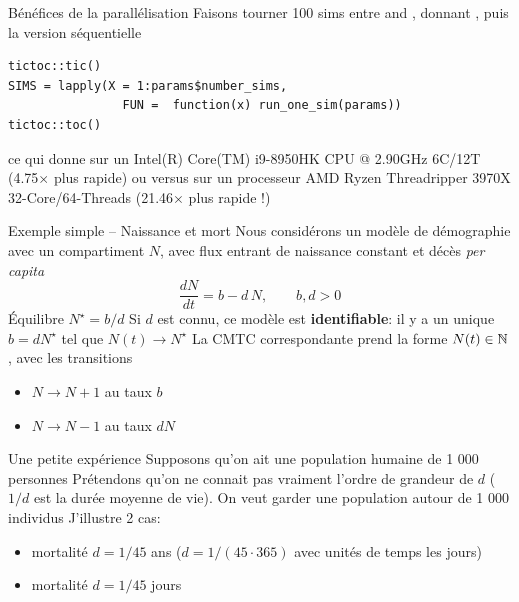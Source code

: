 \documentclass[aspectratio=169]{beamer}\usepackage[]{graphicx}\usepackage[]{xcolor}
\begin{document}

\begin{frame}[fragile]{Bénéfices de la parallélisation}
    Faisons tourner 100 sims entre  and , donnant , puis la version séquentielle
\begin{lstlisting}
tictoc::tic()
SIMS = lapply(X = 1:params$number_sims,
                FUN =  function(x) run_one_sim(params))
tictoc::toc()
\end{lstlisting}
    ce qui donne  sur un Intel(R) Core(TM) i9-8950HK CPU @ 2.90GHz 6C/12T (4.75$\times$ plus rapide) ou  versus  sur un processeur AMD Ryzen Threadripper 3970X 32-Core/64-Threads (21.46$\times$ plus rapide !)
\end{frame}


\begin{frame}{Exemple simple -- Naissance et mort}
Nous considérons un modèle de démographie avec un compartiment $N$, avec flux entrant de naissance constant et décès \emph{per capita}
\[
\frac{dN}{dt} = b - d\,N,\qquad b,d> 0
\]
\vfill
\bbullet Équilibre \(N^\star = b/d\)
\vfill
\bbullet Si $d$ est connu, ce modèle est \textbf{identifiable}: il y a un unique $b = dN^\star$ tel que $N(t)\to N^\star$
\vfill
La CMTC correspondante prend la forme \(N(t)\in\mathbb{N}\), avec les transitions
\begin{itemize}
  \item $N\to N+1$ au taux $b$
  \item $N\to N-1$ au taux $dN$
\end{itemize}
\end{frame}

\begin{frame}{Une petite expérience}
Supposons qu'on ait une population humaine de 1 000 personnes
\vfill
Prétendons qu'on ne connait pas vraiment l'ordre de grandeur de $d$ ($1/d$ est la durée moyenne de vie). On veut garder une population autour de 1 000 individus
\vfill
J'illustre 2 cas:
\begin{itemize}
\item mortalité $d=1/45$ ans ($d=1/(45\cdot 365)$ avec unités de temps les jours)
\item mortalité $d=1/45$ jours
\end{itemize}
\end{frame}
\end{document}
